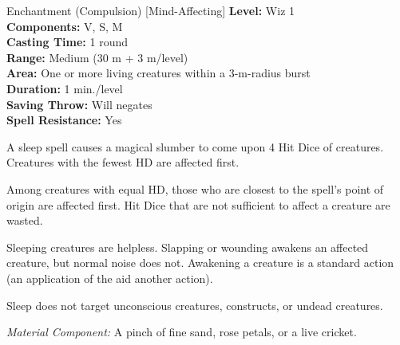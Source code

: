 {Enchantment (Compulsion) [Mind-Affecting]}
{
	\textbf{Level:}
	Wiz 1\\
	\textbf{Components:}
	V, S, M\\
	\textbf{Casting Time:}
	1 round\\
	\textbf{Range:}
	Medium (30 m + 3 m/level)\\
	\textbf{Area:}
	One or more living creatures within a 3-m-radius burst\\
	\textbf{Duration:}
	1 min./level\\
	\textbf{Saving Throw:}
	Will negates\\
	\textbf{Spell Resistance:}
	Yes\\
}
{
	A sleep spell causes a magical slumber to come upon 4 Hit Dice of creatures. Creatures with the fewest HD are affected first.

	Among creatures with equal HD, those who are closest to the spell's point of origin are affected first. Hit Dice that are not sufficient to affect a creature are wasted.

	Sleeping creatures are helpless. Slapping or wounding awakens an affected creature, but normal noise does not. Awakening a creature is a standard action (an application of the aid another action).

	Sleep does not target unconscious creatures, constructs, or undead creatures.

	\textit{Material Component:}
	A pinch of fine sand, rose petals, or a live cricket.

}

